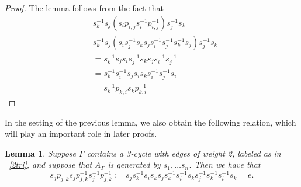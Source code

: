 \documentclass[11pt]{amsart}
\newtheorem{lem}[thm]{Lemma}
\theoremstyle{definition}
\begin{document}
\begin{proof}
The lemma follows from the fact that
\begin{align*}
& s_{k}^{-1}s_{j}(s_{i}p_{i, j}s_{i}^{-1}p_{i, j}^{-1})s_{j}^{-1}s_{k} \\
& s_{k}^{-1}s_{j}(s_{i}s_{j}^{-1}s_{k}s_{j}s_{i}^{-1}s_{j}^{-1}s_{k}^{-1}s_{j})s_{j}^{-1}s_{k} \\
&= s_{k}^{-1}s_{j}s_{i}s_{j}^{-1}s_{k}s_{j}s_{i}^{-1}s_{j}^{-1} \\
&= s_{k}^{-1}s_{i}^{-1}s_{j}s_{i}s_{k}s_{i}^{-1}s_{j}^{-1}s_{i} \\
&= s_{k}^{-1}p_{k, i}s_{k}p_{k, i}^{-1}
\end{align*}
\end{proof}

In the setting of the previous lemma, we also obtain the following relation, which will play an important role in later proofs.

\begin{lem}\label{lem:extra_square_relation}
Suppose $\Gamma$ contains a 3-cycle with edges of weight 2, labeled as in ~\ref{2tri}, and suppose that A$_{\Gamma}$ is generated by $s_{1}, \dots s_{n}$. Then we have that
$$s_{j}p_{j, k}s_{j}p_{j, k}^{-1}s_{j}^{-1}p_{j, k}^{-1} := s_{j}s_{k}^{-1}s_{i}s_{k}s_{j}s_{k}^{-1}s_{i}^{-1}s_{k}s_{j}^{-1}s_{k}^{-1}s_{i}^{-1}s_{k} = e.$$
\end{lem}
\end{document}
